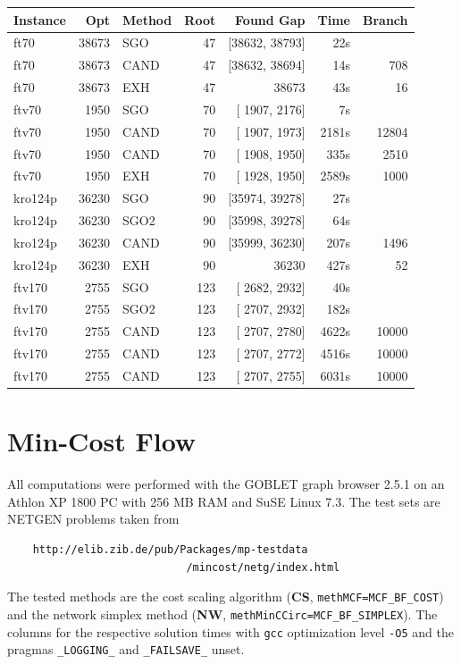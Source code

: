 \documentclass[a4paper,11pt,twoside]{book}
\begin{document}
\begin{multicols}{2}
\vfill
\begin{center}
\small
\begin{tabular}{|lrlrrrr|}
\hline
{\bf Instance} & {\bf Opt} & {\bf Method} & {\bf Root} & {\bf Found Gap} & {\bf Time} & {\bf Branch} \\
\hline
\hline
ft70      &  38673 &  SGO &  47 & [38632, 38793] &    22s & \\
ft70      &  38673 & CAND &  47 & [38632, 38694] &    14s &  708 \\
ft70      &  38673 &  EXH &  47 &         38673  &    43s &   16 \\
ftv70     &   1950 &  SGO &  70 & [ 1907,  2176] &     7s & \\
ftv70     &   1950 & CAND &  70 & [ 1907,  1973] &  2181s & 12804 \\
ftv70     &   1950 & CAND &  70 & [ 1908,  1950] &   335s &  2510 \\
ftv70     &   1950 &  EXH &  70 & [ 1928,  1950] &  2589s &  1000 \\
kro124p   &  36230 &  SGO &  90 & [35974, 39278] &    27s & \\
kro124p   &  36230 & SGO2 &  90 & [35998, 39278] &    64s & \\
kro124p   &  36230 & CAND &  90 & [35999, 36230] &   207s &  1496 \\
kro124p   &  36230 &  EXH &  90 &         36230  &   427s &    52 \\
ftv170    &   2755 &  SGO & 123 & [ 2682,  2932] &    40s & \\
ftv170    &   2755 & SGO2 & 123 & [ 2707,  2932] &   182s & \\
ftv170    &   2755 & CAND & 123 & [ 2707,  2780] &  4622s & 10000 \\
ftv170    &   2755 & CAND & 123 & [ 2707,  2772] &  4516s & 10000 \\
ftv170    &   2755 & CAND & 123 & [ 2707,  2755] &  6031s & 10000 \\
\hline
\end{tabular}
\end{center}



\section{Min-Cost Flow}
All computations were performed with the GOBLET graph browser 2.5.1 on an
Athlon XP 1800 PC with 256 MB RAM and SuSE Linux 7.3. The test sets are
NETGEN problems taken from
\begin{verbatim}
    http://elib.zib.de/pub/Packages/mp-testdata
                            /mincost/netg/index.html
\end{verbatim}
The tested methods are the cost scaling algorithm ({\bf CS}, \verb/methMCF=MCF_BF_COST/)
and the network simplex method ({\bf NW}, \verb/methMinCCirc=MCF_BF_SIMPLEX/).
The columns for the respective solution times with \verb/gcc/ optimization
level \verb/-O5/ and the pragmas \verb/_LOGGING_/ and \verb/_FAILSAVE_/ unset.



\end{multicols}
\end{document}
